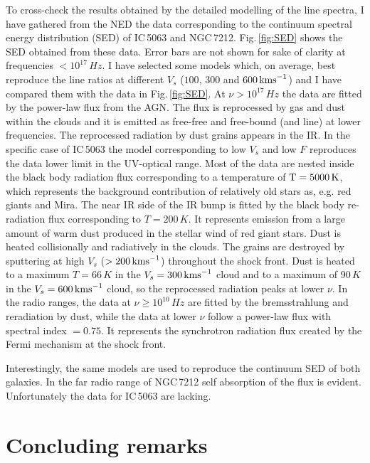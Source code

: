 \documentclass[../main.tex]{subfiles}
\begin{document}
To cross-check the results obtained by the detailed modelling of the line spectra, I have gathered from the NED the data corresponding to the continuum spectral energy distribution (SED) of IC\,5063 and NGC\,7212. 
Fig.\,\ref{fig:SED} shows the SED obtained from these data. 
Error bars are not shown for sake of clarity at frequencies $< 10^{17}\,\si{Hz}$.
I have selected some models which, on average, best reproduce the line ratios at different   $V_s$ ($100$, $300$ and $600 \,\si{\kms}$) and I have compared them with the data in Fig.\,\ref{fig:SED}.
At $\nu>10^{17}\,\si{Hz}$ the data are fitted by the power-law flux from the AGN.
The flux is reprocessed by gas and dust within the clouds and it is emitted as free-free and free-bound (and line) at lower frequencies. 
The reprocessed radiation by dust grains appears in the IR.
In the specific case of IC\,5063 the model corresponding to low $V_s$ and low $F$ reproduces the data lower limit in the UV-optical range.
Most of the data are nested inside the black body radiation flux corresponding to a temperature of $\rm T=5000\,\si{K}$, which represents the background contribution of relatively old stars as, e.g. red giants and Mira. 
The near IR side of the IR bump is fitted by the black body re-radiation flux corresponding to $ T=200\,\si{K}$. 
It represents emission from a large amount of warm dust produced in the stellar wind of red giant stars. 
Dust is heated collisionally and radiatively in the clouds.
The grains are destroyed by sputtering at high   $V_s$ ($> 200 \,\si{\kms}$) throughout the shock front.
Dust is heated to a maximum $T=66\,\si{K}$ in the $V_s =300 \,\si{\kms}$ cloud and to a maximum of $90\,\si{K}$ in the $V_s=600 \,\si{\kms}$ cloud, so the reprocessed radiation peaks at lower $\nu$. 
In the radio ranges, the data at $\nu\geq 10^{10}\,\si{Hz}$ are fitted by the bremsstrahlung and reradiation by dust, while the data at lower $\nu$ follow a power-law flux with spectral index $=0.75$. 
It represents the synchrotron radiation flux created by the Fermi mechanism at the shock front.

Interestingly, the same models are used to reproduce the continuum SED of  both galaxies.
In the far radio range of NGC\,7212 self absorption of the flux is evident. 
Unfortunately the data for IC\,5063 are lacking.


\section{Concluding remarks}
\label{sec:conclusions}
\end{document}
